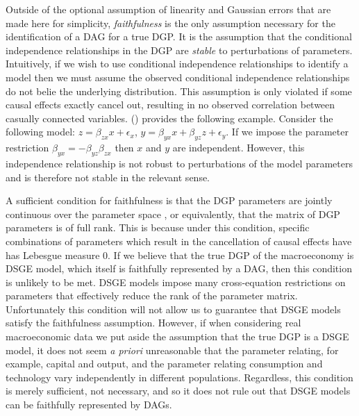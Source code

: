 \documentclass{article}
\begin{document}
Outside of the optional assumption of linearity and Gaussian errors that are made here for simplicity, \textit{faithfulness} is the only assumption necessary for the identification of a DAG for a true DGP. It is the assumption that the conditional independence relationships in the DGP are \textit{stable} to perturbations of parameters. Intuitively, if we wish to use conditional independence relationships to identify a model then we must assume the observed conditional independence relationships do not belie the underlying distribution. This assumption is only violated if some causal effects exactly cancel out, resulting in no observed correlation between casually connected variables. \citeauthor{pearl2009causality} (\citeyear{pearl2009causality}) provides the following example. Consider the following model: $z = \beta_{zx} x + \epsilon_x$, $ y = \beta_{yx} x + \beta_{yz} z + \epsilon_y$. If we impose the parameter restriction $\beta_{yx} = -\beta_{yz}\beta_{zx}$ then $x$ and $y$ are independent. However, this independence relationship is not robust to perturbations of the model parameters and is therefore not stable in the relevant sense. 

A sufficient condition for faithfulness is that the DGP parameters are jointly continuous over the parameter space \parencite{steel2006homogeneity}, or equivalently, that the matrix of DGP parameters is of full rank. This is because under this condition, specific combinations of parameters which result in the cancellation of causal effects have has Lebesgue measure 0. If we believe that the true DGP of the macroeconomy is DSGE model, which itself is faithfully represented by a DAG, then this condition is unlikely to be met. DSGE models impose many cross-equation restrictions on parameters that effectively reduce the rank of the parameter matrix. Unfortunately this condition will not allow us to guarantee that DSGE models satisfy the faithfulness assumption. However, if when considering real macroeconomic data we put aside the assumption that the true DGP is a DSGE model, it does not seem \textit{a priori} unreasonable that the parameter relating, for example, capital and output, and the parameter relating consumption and technology vary independently in different populations. Regardless, this condition is merely sufficient, not necessary, and so it does not rule out that DSGE models can be faithfully represented by DAGs. 
\end{document}
